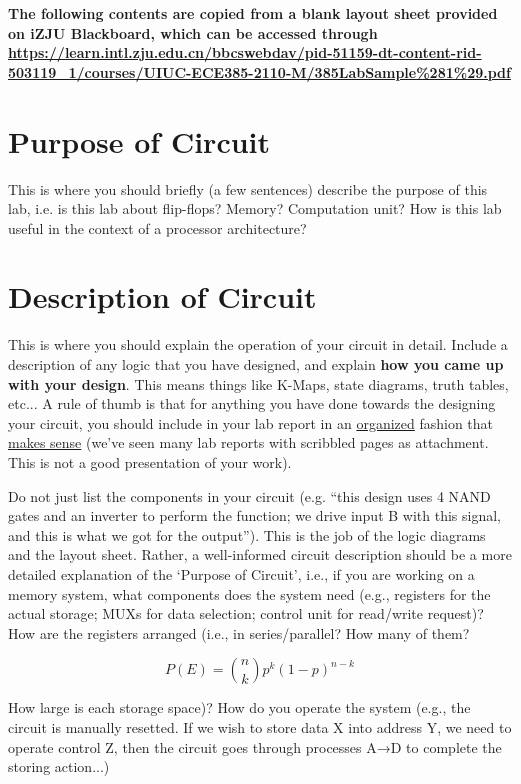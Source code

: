 \documentclass[11pt, a4paper]{article}
\begin{document}
    \maketitlepage

    {\bfseries The following contents are copied from a blank layout sheet provided on iZJU Blackboard, which can be accessed through \url{https://learn.intl.zju.edu.cn/bbcswebdav/pid-51159-dt-content-rid-503119_1/courses/UIUC-ECE385-2110-M/385LabSample%281%29.pdf} }

    \section{Purpose of Circuit}
    This is where you should briefly (a few sentences) describe the purpose of this lab, i.e. is 
    this lab about flip-flops? Memory? Computation unit? How is this lab useful in the 
    context of a processor architecture?

    \section{Description of Circuit}
    This is where you should explain the operation of your circuit in detail. Include a 
    description of any logic that you have designed, and explain \textbf{how you came up with 
    your design}. This means things like K-Maps, state diagrams, truth tables, etc... A rule 
    of thumb is that for anything you have done towards the designing your circuit, you 
    should include in your lab report in an \underline{organized} fashion that \underline{makes sense} (we've seen 
    many lab reports with scribbled pages as attachment. This is not a good presentation of 
    your work).

    Do not just list the components in your circuit (e.g. ``this design uses 4 NAND gates and 
    an inverter to perform the function; we drive input B with this signal, and this is what we 
    got for the output''). This is the job of the logic diagrams and the layout sheet. Rather, a 
    well-informed circuit description should be a more detailed explanation of the `Purpose 
    of Circuit', i.e., if you are working on a memory system, what components does the 
    system need (e.g., registers for the actual storage; MUXs for data selection; control unit 
    for read/write request)? How are the registers arranged (i.e., in series/parallel? How 
    many of them?
    
    \[P(E) = {n \choose k} p^k (1-p)^{ n-k} \]

    How large is each storage space)? How do you operate the system (e.g., 
    the circuit is manually resetted. If we wish to store data X into address Y, we need to 
    operate control Z, then the circuit goes through processes A→D to complete the storing 
    action...)
\end{document}

